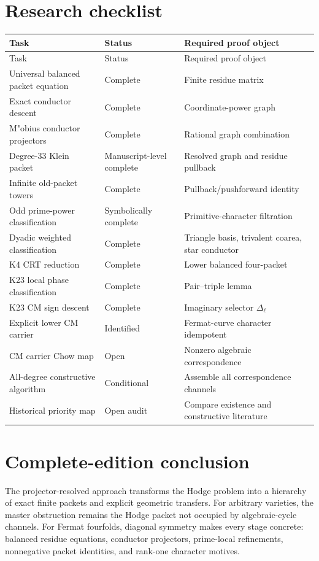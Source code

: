 \documentclass[11pt,oneside]{book}
\theoremstyle{definition}
\theoremstyle{remark}
\begin{document}
\chapter{Research checklist}
\begin{longtable}{p{}p{}p{}}
\toprule
Task & Status & Required proof object \\
\midrule\endfirsthead
\toprule
Task & Status & Required proof object \\
\midrule\endhead
Universal balanced packet equation & Complete & Finite residue matrix \\
Exact conductor descent & Complete & Coordinate-power graph \\
M"obius conductor projectors & Complete & Rational graph combination \\
Degree-33 Klein packet & Manuscript-level complete & Resolved graph and residue pullback \\
Infinite old-packet towers & Complete & Pullback/pushforward identity \\
Odd prime-power classification & Symbolically complete & Primitive-character filtration \\
Dyadic weighted classification & Complete & Triangle basis, trivalent coarea, star conductor \\
K4 CRT reduction & Complete & Lower balanced four-packet \\
K23 local phase classification & Complete & Pair--triple lemma \\
K23 CM sign descent & Complete & Imaginary selector $\Delta_\ell$ \\
Explicit lower CM carrier & Identified & Fermat-curve character idempotent \\
CM carrier Chow map & Open & Nonzero algebraic correspondence \\
All-degree constructive algorithm & Conditional & Assemble all correspondence channels \\
Historical priority map & Open audit & Compare existence and constructive literature \\
\bottomrule
\end{longtable}

\chapter{Complete-edition conclusion}
The projector-resolved approach transforms the Hodge problem into a hierarchy of exact finite packets and explicit geometric transfers. For arbitrary varieties, the master obstruction remains the Hodge packet not occupied by algebraic-cycle channels. For Fermat fourfolds, diagonal symmetry makes every stage concrete: balanced residue equations, conductor projectors, prime-local refinements, nonnegative packet identities, and rank-one character motives.
\end{document}
